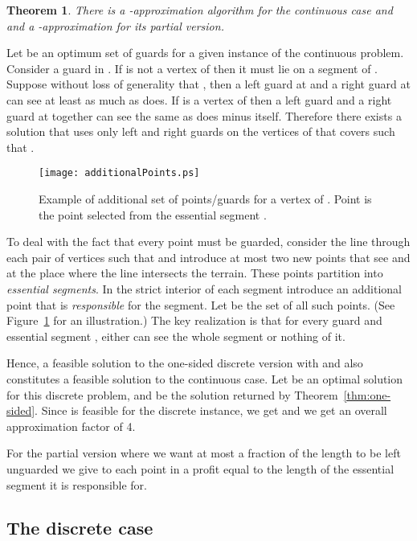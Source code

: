 \documentclass[11pt]{article}
\newtheorem{theorem}{Theorem}
\begin{document}
\begin{theorem} \label{thm:continuous}
  There is a -approximation algorithm for the continuous case and and a -approximation for its partial version.
\end{theorem}

Let  be an optimum set of guards for a given instance  of the
continuous problem. Consider a guard  in . If  is not a vertex
of  then it must lie on a segment  of . Suppose without loss of generality that ,
then a left guard at  and a right guard at 
can see at least as much as  does. If  is a vertex of  then a left
guard and a right guard at  together can see the same as  does minus 
itself. Therefore there exists a solution  that uses only left and right
guards on the vertices of  that covers  such
that .

\begin{figure}[t]
  \centering
  \texttt{[image: additionalPoints.ps]}
  \caption{Example of additional set of points/guards for a vertex  of .
  Point  is the point selected from the essential segment .}
  \label{fig:additionalPoints}
\end{figure}

To deal with the fact that every point must be guarded, consider the line
through each pair of vertices  such that  and
introduce at most two new points that see  and  at the place where
the line intersects the terrain. These points partition  into 
\emph{essential segments}. In the strict interior of each segment introduce an
additional point  that is \emph{responsible} for the segment. Let  be
the set of all such points. (See Figure~\ref{fig:additionalPoints} for an illustration.) The key realization is that for every guard  and essential
segment , either  can see the whole segment or nothing of it.

Hence, a feasible solution to the one-sided discrete version with 
and  also constitutes a feasible solution to the continuous case. Let  be an optimal solution for this discrete problem, and  be
the solution returned by Theorem~\ref{thm:one-sided}. Since  is feasible for the discrete instance, we get
 and we get
an overall approximation factor of 4.

For the partial version where we want at most a fraction of the length to be
left unguarded we give to each point in  a profit equal to the length
of the essential segment it is responsible for.

\subsection{The discrete case}
\end{document}
